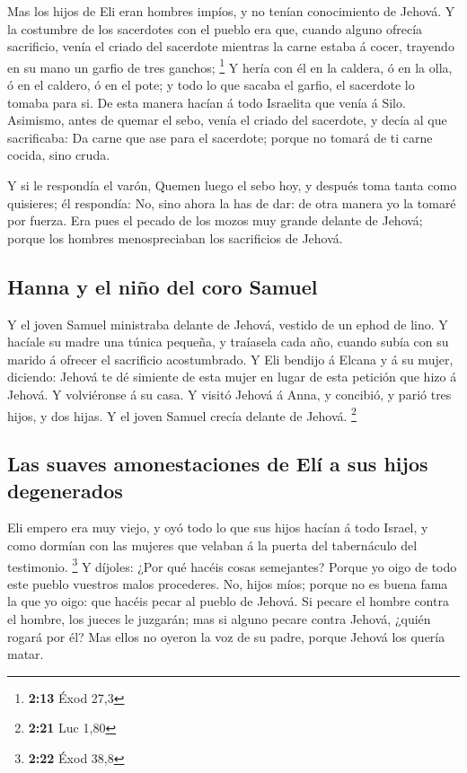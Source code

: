  Mas los hijos de Eli eran hombres impíos, y no tenían
conocimiento de Jehová.  Y la costumbre de los sacerdotes
con el pueblo era que, cuando alguno ofrecía sacrificio, venía el criado
del sacerdote mientras la carne estaba á cocer, trayendo en su mano un
garfio de tres ganchos; \footnote{\textbf{2:13} Éxod 27,3}
 Y hería con él en la caldera, ó en la olla, ó en el
caldero, ó en el pote; y todo lo que sacaba el garfio, el sacerdote lo
tomaba para si. De esta manera hacían á todo Israelita que venía á Silo.
 Asimismo, antes de quemar el sebo, venía el criado del
sacerdote, y decía al que sacrificaba: Da carne que ase para el
sacerdote; porque no tomará de ti carne cocida, sino cruda.

 Y si le respondía el varón, Quemen luego el sebo hoy, y
después toma tanta como quisieres; él respondía: No, sino ahora la has
de dar: de otra manera yo la tomaré por fuerza.  Era pues
el pecado de los mozos muy grande delante de Jehová; porque los hombres
menospreciaban los sacrificios de Jehová.

\hypertarget{hanna-y-el-niuxf1o-del-coro-samuel}{%
\subsection{Hanna y el niño del coro
Samuel}\label{hanna-y-el-niuxf1o-del-coro-samuel}}

 Y el joven Samuel ministraba delante de Jehová, vestido
de un ephod de lino.  Y hacíale su madre una túnica
pequeña, y traíasela cada año, cuando subía con su marido á ofrecer el
sacrificio acostumbrado.  Y Eli bendijo á Elcana y á su
mujer, diciendo: Jehová te dé simiente de esta mujer en lugar de esta
petición que hizo á Jehová. Y volviéronse á su casa.  Y
visitó Jehová á Anna, y concibió, y parió tres hijos, y dos hijas. Y el
joven Samuel crecía delante de Jehová. \footnote{\textbf{2:21} Luc 1,80}

\hypertarget{las-suaves-amonestaciones-de-eluxed-a-sus-hijos-degenerados}{%
\subsection{Las suaves amonestaciones de Elí a sus hijos
degenerados}\label{las-suaves-amonestaciones-de-eluxed-a-sus-hijos-degenerados}}

 Eli empero era muy viejo, y oyó todo lo que sus hijos
hacían á todo Israel, y como dormían con las mujeres que velaban á la
puerta del tabernáculo del testimonio. \footnote{\textbf{2:22} Éxod 38,8}
 Y díjoles: ¿Por qué hacéis cosas semejantes? Porque yo
oigo de todo este pueblo vuestros malos procederes.  No,
hijos míos; porque no es buena fama la que yo oigo: que hacéis pecar al
pueblo de Jehová.  Si pecare el hombre contra el hombre,
los jueces le juzgarán; mas si alguno pecare contra Jehová, ¿quién
rogará por él? Mas ellos no oyeron la voz de su padre, porque Jehová los
quería matar.


